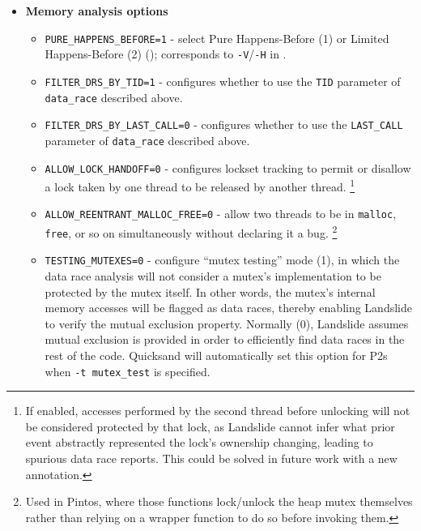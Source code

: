 \begin{itemize}
\item {\bf Memory analysis options}
\begin{itemize}
	\item {\tt PURE\_HAPPENS\_BEFORE=1} - select Pure Happens-Before (1) or Limited Happens-Before (2) (\sect{\ref{sec:background-hb}});
		corresponds to {\tt -V}/{\tt -H} in \sect{\ref{sec:landslide-quicksand-options}}.
	\item {\tt FILTER\_DRS\_BY\_TID=1} - configures whether to use the {\tt TID} parameter of {\tt data\_\allowbreak{}race} described above.
	\item {\tt FILTER\_DRS\_BY\_LAST\_CALL=0} - configures whether to use the {\tt LAST\_CALL} parameter of {\tt data\_race} described above.
	\item {\tt ALLOW\_LOCK\_HANDOFF=0} - configures lockset tracking to permit or disallow a lock taken by one thread to be released by another thread.%
		\footnote{If enabled, accesses performed by the second thread before unlocking will not be considered protected by that lock,
			as Landslide cannot infer what prior event abstractly represented the lock's ownership changing,
			leading to spurious data race reports.
			This could be solved in future work with a new annotation.}
	\item {\tt ALLOW\_REENTRANT\_MALLOC\_FREE=0} - allow two threads to be in {\tt malloc}, {\tt free}, or so on simultaneously without declaring it a bug.%
		\footnote{Used in Pintos, where those functions lock/unlock the heap mutex themselves rather than relying on a wrapper function to do so before invoking them.}
	\item {\tt TESTING\_MUTEXES=0} - configure ``mutex testing'' mode (1),
		in which the data race analysis will not consider a mutex's implementation to be protected by the mutex itself.
		In other words, the mutex's internal memory accesses will be flagged as data races,
		thereby enabling Landslide to verify the mutual exclusion property.
		Normally (0), Landslide assumes mutual exclusion is provided in order to efficiently find data races in the rest of the code.
		Quicksand will automatically set this option for P2s when {\tt -t mutex\_test} is specified.
\end{itemize}


\end{itemize}
